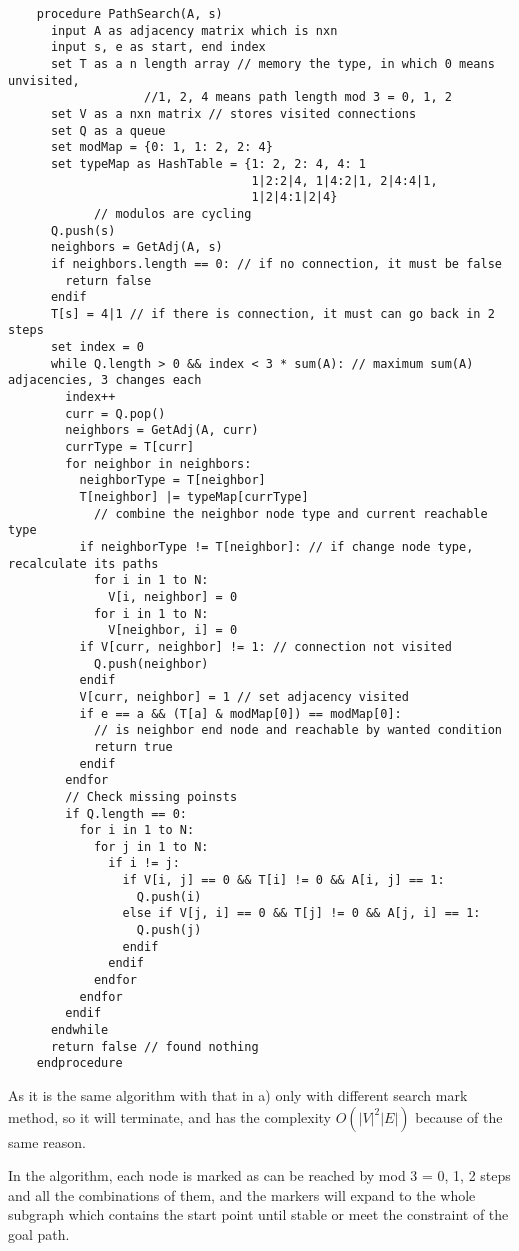 \documentclass{article}
\begin{document}
\begin{enumerate}[topsep=0pt]
\begin{enumerate}
\begin{verbatim}
    procedure PathSearch(A, s)
      input A as adjacency matrix which is nxn
      input s, e as start, end index
      set T as a n length array // memory the type, in which 0 means unvisited, 
                   //1, 2, 4 means path length mod 3 = 0, 1, 2
      set V as a nxn matrix // stores visited connections
      set Q as a queue
      set modMap = {0: 1, 1: 2, 2: 4}
      set typeMap as HashTable = {1: 2, 2: 4, 4: 1
                                  1|2:2|4, 1|4:2|1, 2|4:4|1,
                                  1|2|4:1|2|4} 
            // modulos are cycling
      Q.push(s)
      neighbors = GetAdj(A, s)
      if neighbors.length == 0: // if no connection, it must be false
        return false
      endif
      T[s] = 4|1 // if there is connection, it must can go back in 2 steps
      set index = 0
      while Q.length > 0 && index < 3 * sum(A): // maximum sum(A) adjacencies, 3 changes each
        index++
        curr = Q.pop()
        neighbors = GetAdj(A, curr)
        currType = T[curr]
        for neighbor in neighbors:
          neighborType = T[neighbor]
          T[neighbor] |= typeMap[currType] 
            // combine the neighbor node type and current reachable type
          if neighborType != T[neighbor]: // if change node type, recalculate its paths
            for i in 1 to N:
              V[i, neighbor] = 0
            for i in 1 to N:
              V[neighbor, i] = 0
          if V[curr, neighbor] != 1: // connection not visited
            Q.push(neighbor)
          endif
          V[curr, neighbor] = 1 // set adjacency visited
          if e == a && (T[a] & modMap[0]) == modMap[0]: 
            // is neighbor end node and reachable by wanted condition
            return true
          endif
        endfor
        // Check missing poinsts
        if Q.length == 0:
          for i in 1 to N:
            for j in 1 to N:
              if i != j:
                if V[i, j] == 0 && T[i] != 0 && A[i, j] == 1:
                  Q.push(i)
                else if V[j, i] == 0 && T[j] != 0 && A[j, i] == 1:
                  Q.push(j)
                endif
              endif
            endfor
          endfor
        endif
      endwhile
      return false // found nothing
    endprocedure
  \end{verbatim}
  
  As it is the same algorithm with that in a) only with different search mark method, so it will terminate, and has the complexity $O(|V|^2|E|)$ because of the same reason.

  In the algorithm, each node is marked as can be reached by mod 3 = 0, 1, 2 steps and all the combinations of them, and the markers will expand to the whole subgraph which contains the start point until stable or meet the constraint of the goal path.



\end{enumerate}
\end{enumerate}
\end{document}
